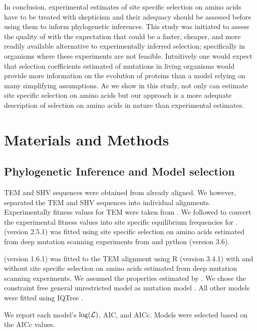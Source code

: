 In conclusion, experimental estimates of site specific selection on amino acids have to be treated with skepticism and their adequacy should be assessed before using them to inform phylogenetic inferences.
This study was initiated to assess the quality of \selac with the expectation that \selac could be a faster, cheaper, and more readily available alternative to experimentally inferred selection;
specifically in organisms where these experiments are not feasible.
Intuitively one would expect that selection coefficients estimated of mutations in living organisms would provide more information on the evolution of proteins than a model relying on many simplifying assumptions.
As we show in this study, not only can \selac estimate site specific selection on amino acids but our approach is a more adequate description of selection on amino acids in nature than experimental estimates.


\section{Materials and Methods}

\subsection{Phylogenetic Inference and Model selection}

TEM and SHV sequences were obtained from \citet{bloom2017} already aligned.
We however, separated the TEM and SHV sequences into individual alignments.
Experimentally fitness values for TEM were taken from \citet{stiffler2016}.
We followed \citep{bloom2017} to convert the experimental fitness values into site specific equilibrium frequencies for \phydms. 
\phydms (version 2.5.1) was fitted using site specific selection on amino acids estimated from deep mutation scanning experiments from \citet{stiffler2016} and python (version 3.6).

\selac (version 1.6.1) was fitted to the TEM alignment using R (version 3.4.1) \citep{rcore} with and without site specific selection on amino acids estimated from deep mutation scanning experiments.
We assumed the \PC properties estimated by \citet{grantham1974}.
We chose the constraint free  general unrestricted model \citep{yang1994} as mutation model .
All other models were fitted using IQTree \citep{nguyen2015}.

We report each model's $\log(\mathcal{L})$, AIC, and  AICc. 
Models were selected based on the AICc values.

